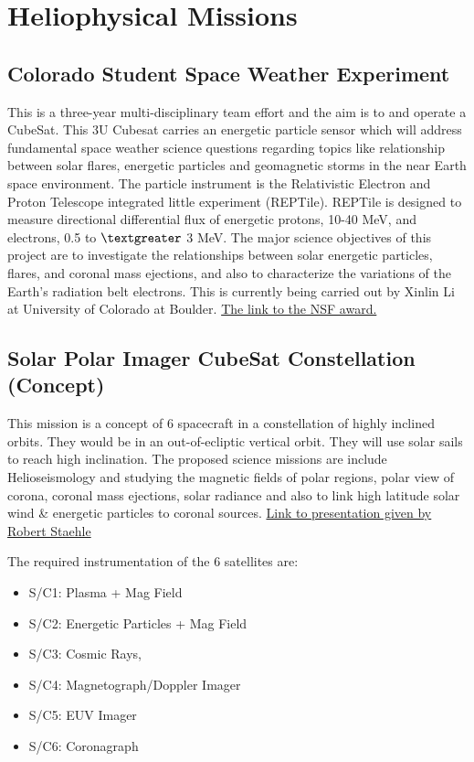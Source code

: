 \section{Heliophysical Missions}

\subsection{Colorado Student Space Weather Experiment}
\label{colorado}

This is a three-year multi-disciplinary team effort and the aim is to and operate a CubeSat. This 3U Cubesat carries an energetic particle sensor which will address fundamental space weather science questions regarding topics like relationship between solar flares, energetic particles and geomagnetic storms in the near Earth space environment. The particle instrument is the Relativistic Electron and Proton Telescope integrated little experiment (REPTile). REPTile is designed to measure directional differential flux of energetic protons, 10-40 MeV, and electrons, 0.5 to $\textgreater$ 3 MeV.  The major science objectives of this project are to investigate the relationships between solar energetic particles, flares, and coronal mass ejections, and also to characterize the variations of the Earth's radiation belt electrons. This is currently being carried out by Xinlin Li at University of Colorado at Boulder. \href{http://nsf.gov/awardsearch/showAward?AWD_ID=1042815&HistoricalAwards=false}{The link to the NSF award.}

\subsection{Solar Polar Imager CubeSat Constellation (Concept)}
\label{solar_polar}
This mission is a concept of 6 spacecraft in a constellation of highly inclined orbits. They would be in an out-of-ecliptic vertical orbit. They will use solar sails to reach high inclination. The proposed science missions are include Helioseismology and studying the magnetic fields of polar regions, polar view of corona, coronal mass ejections, solar radiance and also to link high latitude solar wind \& energetic particles to coronal sources.  \href{http://kiss.caltech.edu/cosponsored/cubesat2012/presentations/staehle-interplanetary-cubesat-missions.pdf}{Link to presentation given by Robert Staehle}

The required instrumentation of the 6  satellites are:
\begin{itemize}
\item S/C1: Plasma + Mag Field 
\item S/C2: Energetic Particles + Mag Field 
\item S/C3: Cosmic Rays, 
\item S/C4: Magnetograph/Doppler Imager 
\item S/C5: EUV Imager 
\item S/C6: Coronagraph 
\end{itemize}


